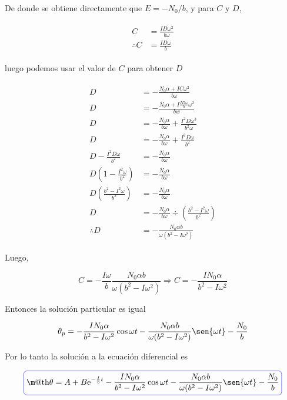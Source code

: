 \documentclass[a4paper,10pt]{article}
\makeatletter
\newcommand*{\boxcolor}{blue}
\renewcommand{\boxed}[1]{\textcolor{\boxcolor}{%
\tikz[baseline={([yshift=-1ex]current bounding box.center)}] \node [rectangle, minimum width=1ex,rounded corners,draw] {\normalcolor\m@th$\displaystyle#1$};}}
\newcommand{\euler}{\mathrm{e}}
\makeatother
\begin{document}
De donde se obtiene directamente que $E = -N_0/b$, y para $C$ y $D$, 

\begin{align*}
 \begin{split}
  C &= \frac{ID\omega^2}{b\omega} \\
  \therefore C &= \frac{ID\omega}{b} 
 \end{split}
\end{align*}

luego podemos usar el valor de $C$ para obtener $D$

\begin{align*}
 \begin{split}
  D &= - \frac{N_0 \alpha + IC\omega^2}{b\omega} \\
  D &= - \frac{N_0 \alpha + I \frac{ID\omega}{b} \omega^2}{bw} \\
  D &= - \frac{N_0 \alpha}{b\omega} + \frac{I^2 D \omega^3}{b^2\omega} \\
  D &= - \frac{N_0 \alpha}{b\omega} + \frac{I^2D\omega}{b^2} \\
  D - \frac{I^2D\omega}{b^2} &= - \frac{N_0 \alpha}{b\omega} \\
  D  \left(1 - \frac{I^2\omega}{b^2} \right) &= - \frac{N_0 \alpha}{b\omega} \\
  D \left(\frac{b^2-I^2\omega}{b^2} \right) &= - \frac{N_0 \alpha}{b\omega} \\
  D &= - \frac{N_0\alpha}{b\omega} \div \left(\frac{b^2-I^2\omega}{b^2} \right) \\
  \therefore D &= - \frac{N_0 \alpha b}{\omega(b^2-I\omega^2)}
 \end{split}
\end{align*}

Luego,

$$
C = - \frac{I\omega}{b}  \frac{N_0 \alpha b}{\omega(b^2-I\omega^2)} 
\Rightarrow C = - \frac{IN_0 \alpha}{b^2-I\omega^2}
$$

Entonces la solución particular es igual 

\begin{equation}
 \theta_p = - \frac{IN_0 \alpha}{b^2-I\omega^2} \cos{\omega t} 
 - \frac{N_0 \alpha b}{\omega(b^2-I\omega^2)} \sen{\omega t} - \frac{N_0}{b}
\end{equation}


Por lo tanto la solución a la ecuación diferencial es

\begin{equation}
 \boxed{\theta = A + B \euler^{-\frac{I}{b}t} - \frac{IN_0 \alpha}{b^2-I\omega^2} \cos{\omega t} 
 - \frac{N_0 \alpha b}{\omega(b^2-I\omega^2)} \sen{\omega t} - \frac{N_0}{b}}
\end{equation}
\end{document}
